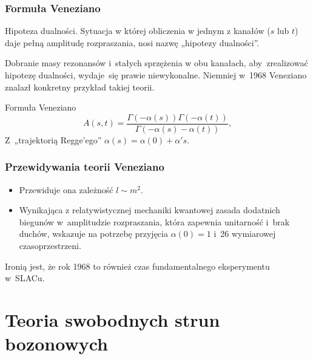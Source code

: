 \documentclass[10pt,t]{beamer}
\begin{document}
\begin{frame}
  \frametitle{Formuła Veneziano}


  Hipoteza dualności. Sytuacja w której obliczenia w jednym z kanałów ($s$
  lub $t$) daje pełną amplitudę rozpraszania, nosi nazwę „hipotezy
  dualności”.

  Dobranie masy rezonansów i~stałych sprzężenia w obu kanałach,
  aby~zrealizować hipotezę dualności, wydaje~się prawie niewykonalne.
  Niemniej w~1968 Veneziano znalazł konkretny przykład takiej teorii.

  Formuła Veneziano
  \begin{equation}
    \label{eq:O-teorii-strun-03}
    A( s, t ) =
    \frac{ \Gamma( -\alpha( s ) ) \Gamma( -\alpha( t ) ) }{ \Gamma( -\alpha( s ) - \alpha( t ) ) },
  \end{equation}
  Z~„trajektorią Regge’ego” $\alpha( s ) = \alpha( 0 ) + \alpha' s $.

\end{frame}





\begin{frame}
  \frametitle{Przewidywania teorii Veneziano}


  \begin{itemize}
    \RaggedRight

  \item Przewiduje ona zależność $l \sim m^{ 2 }$.

  \item Wynikająca z relatywistycznej mechaniki kwantowej zasada
    dodatnich biegunów w~amplitudzie rozpraszania, która zapewnia
    unitarność i~brak duchów, wskazuje na potrzebę przyjęcia
    $\alpha( 0 ) = 1$ i~26 wymiarowej czasoprzestrzeni.

  \end{itemize}

  Ironią jest, że  rok 1968 to również czas fundamentalnego eksperymentu
  w~SLACu.

\end{frame}










\section{Teoria swobodnych strun bozonowych}
\end{document}
